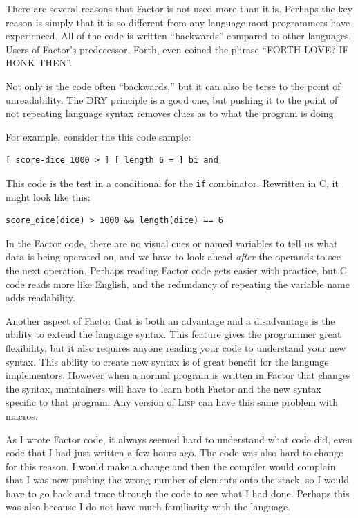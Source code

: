 \documentclass{article}
\begin{document}
There are several reasons that Factor is not used more than it is.  Perhaps the
key reason is simply that it is so different from any language most programmers
have experienced.  All of the code is written ``backwards'' compared to other
languages.  Users of Factor's predecessor, Forth, even coined the phrase ``FORTH
LOVE? IF HONK THEN''.

Not only is the code often ``backwards,'' but it can also be terse to the point
of unreadability.  The DRY principle is a good one, but pushing it to the point
of not repeating language syntax removes clues as to what the program is doing.

For example, consider the this code sample:

\begin{verbatim}
[ score-dice 1000 > ] [ length 6 = ] bi and
\end{verbatim}

This code is the test in a conditional for the \texttt{if} combinator.
Rewritten in C, it might look like this:

\begin{verbatim}
score_dice(dice) > 1000 && length(dice) == 6
\end{verbatim}

In the Factor code, there are no visual cues or named variables to tell us what
data is being operated on, and we have to look ahead \emph{after} the operands to see
the next operation.  Perhaps reading Factor code gets easier with practice, but
C code reads more like English, and the redundancy of repeating the variable name
adds readability.

Another aspect of Factor that is both an advantage and a disadvantage is the
ability to extend the language syntax.  This feature gives the programmer great
flexibility, but it also requires anyone reading your code to understand your
new syntax.  This ability to create new syntax is of great benefit for the
language implementors.  However when a normal program is written in Factor that
changes the syntax, maintainers will have to learn both Factor and the new
syntax specific to that program.  Any version of \textsc{Lisp} can have this
same problem with macros.

As I wrote Factor code, it always seemed hard to understand what code did, even
code that I had just written a few hours ago.  The code was also hard to change
for this reason.  I would make a change and then the compiler would complain
that I was now pushing the wrong number of elements onto the stack, so I would
have to go back and trace through the code to see what I had done.  Perhaps this
was also because I do not have much familiarity with the language.
\end{document}
